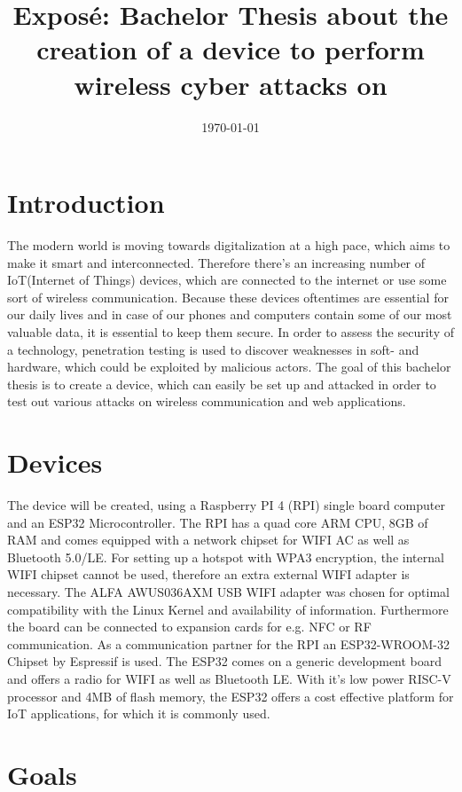 \documentclass{article}
\title{Exposé: Bachelor Thesis about the creation of a device to perform wireless cyber attacks on}
\author{}
\date{\today}
\begin{document}
\maketitle

\section{Introduction}

The modern world is moving towards digitalization at a high pace, which aims to make it smart and interconnected. Therefore there's an increasing number of IoT(Internet of Things) devices, 
which are connected to the internet or use some sort of wireless communication.
Because these devices oftentimes are essential for our daily lives and in case of our phones and computers contain some of our most valuable data, it is essential to keep them secure.
In order to assess the security of a technology, penetration testing is used to discover weaknesses in soft- and hardware, which could be exploited by malicious actors.
The goal of this bachelor thesis is to create a device, which can easily be set up and attacked in order to test out various attacks on wireless communication and web applications.  

\section{Devices}

The device will be created, using a Raspberry PI 4 (RPI) single board computer and an ESP32 Microcontroller. 
The RPI has a quad core ARM CPU, 8GB of RAM and comes equipped with a network chipset for WIFI AC as well as Bluetooth 5.0/LE. 
For setting up a hotspot with WPA3 encryption, the internal WIFI chipset cannot be used, therefore an extra external WIFI adapter is necessary.
The ALFA AWUS036AXM USB WIFI adapter was chosen for optimal compatibility with the Linux Kernel and availability of information.
Furthermore the board can be connected to expansion cards for e.g. NFC or RF communication.
As a communication partner for the RPI an ESP32-WROOM-32 Chipset by Espressif is used. The ESP32 comes on a generic development board and offers a radio for WIFI as well as Bluetooth LE.
With it's low power RISC-V processor and 4MB of flash memory, the ESP32 offers a cost effective platform for IoT applications, for which it is commonly used. 



\section{Goals}
\end{document}
